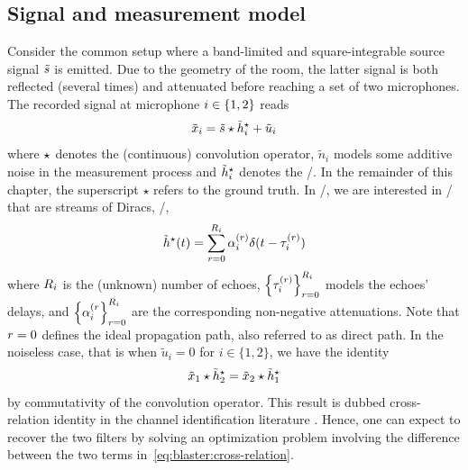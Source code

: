 \subsection{Signal and measurement model}
Consider the common setup where a band-limited and square-integrable source signal $\tilde{s}$ is emitted.
Due to the geometry of the room, the latter signal is both reflected (several times) and attenuated before reaching a set of two microphones.
The recorded signal at microphone $i\in\{1,2\}$ reads
\begin{equation}
    \label{eq:blaster:recordedSignal}
    \tilde{x}_i = \tilde{s} \star \tilde{h}_i^\star + \tilde{u}_i
\end{equation}
where $\star$ denotes the (continuous) convolution operator, $\tilde{n}_i$ models some additive noise in the measurement process and $\tilde{h}_i^\star$ denotes the \RIRdef/.
In the remainder of this chapter, the superscript $\star$ refers to the ground truth.
In \AER/, we are interested in \RIRs/ that are streams of Diracs, \ie/,
\begin{equation}
    \label{eq:blaster:def_filter_star}
    \tilde{h}^\star(t) = \sum_{r=0}^{R_i} \alpha_i^{(r)} \delta(t - \tau_i^{(r)})
\end{equation}
where $R_i$ is the (unknown) number of echoes, $\kfamily{\tau_{i}^{(r)}}{\idxEch=0}^{\numEchs_i}$ models the echoes' delays, and $\kfamily{\alpha_{i}^{(\idxEch}}{\idxEch=0}^{\numEchs_i}$ are the corresponding non-negative attenuations.
Note that $r=0$ defines the ideal propagation path, also referred to as direct path.
%
In the noiseless case, that is when $\tilde{u}_i = 0$ for $i\in\{1,2\}$, we have the identity
\begin{equation} \label{eq:blaster:cross-relation}
    \tilde{x}_1 \star \tilde{h}_2^\star = \tilde{x}_2 \star \tilde{h}_1^\star
\end{equation}
by commutativity of the convolution operator.
This result is dubbed cross-relation identity in the channel identification literature .
Hence, one can expect to recover the two filters by solving an optimization problem involving the difference between the two terms in~\cref{eq:blaster:cross-relation}.

